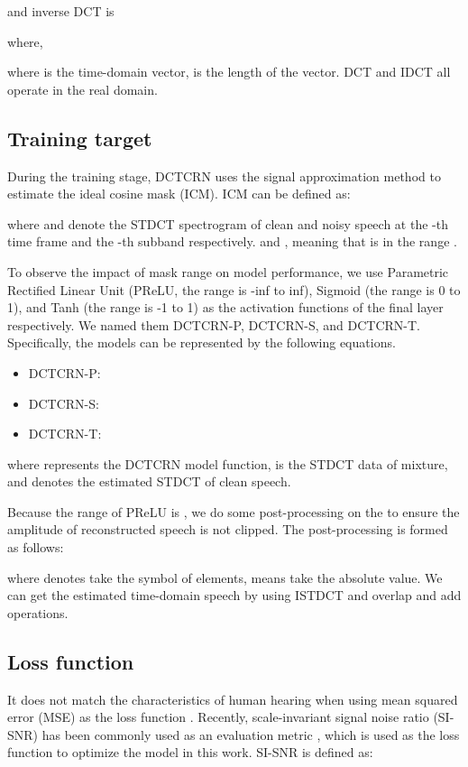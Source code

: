 \documentclass[journal,10pt]{IEEEtran}
\begin{document}
and inverse DCT is

where,

where  is the time-domain vector,  is the length of the vector. DCT and IDCT all operate in the real domain.

\subsection{Training target}

During the training stage, DCTCRN uses the signal approximation method to estimate the ideal cosine mask (ICM). ICM can be defined as:

where  and  denote the STDCT spectrogram of clean and noisy speech at the -th time frame and the -th subband respectively.  and  , meaning that  is in the range .

To observe the impact of mask range on model performance, we use Parametric Rectified Linear Unit (PReLU, the range is -inf to inf), Sigmoid (the range is 0 to 1), and Tanh (the range is -1 to 1) as the activation functions of the final layer respectively. We named them DCTCRN-P, DCTCRN-S, and DCTCRN-T. Specifically, the models can be represented by the following equations.

\begin{itemize}
\item DCTCRN-P:

\item DCTCRN-S:

\item DCTCRN-T:

\end{itemize}
where  represents the DCTCRN model function,  is the STDCT data of mixture, and  denotes the estimated STDCT of clean speech.

Because the range of PReLU is , we do some post-processing on the  to ensure the amplitude of reconstructed speech is not clipped. The post-processing is formed as follows:

where  denotes take the symbol of elements,  means take the absolute value. We can get the estimated time-domain speech by using ISTDCT and overlap and add operations.

\subsection{Loss function}

It does not match the characteristics of human hearing when using mean squared error (MSE) as the loss function \cite{shivakumar2016perception, liu2017perceptually, martin2018deep, kolbaek2018monaural}. Recently, scale-invariant signal noise ratio (SI-SNR) has been commonly used as an evaluation metric \cite{le2019sdr}, which is used as the loss function to optimize the model in this work. SI-SNR is defined as:
\end{document}
